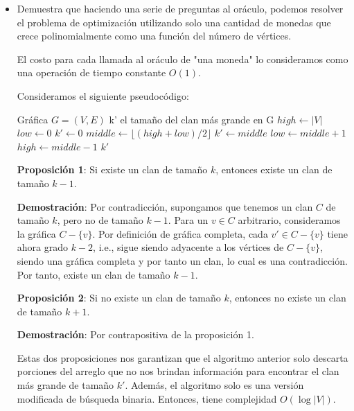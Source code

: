 \begin{itemize}
    \item Demuestra que haciendo una serie de preguntas al oráculo, podemos resolver el problema de optimización utilizando solo una cantidad de monedas que crece polinomialmente como una función del número de vértices.

    El costo para cada llamada al oráculo de "una moneda" lo consideramos como una operación de tiempo constante $O(1)$.

    Consideramos el siguiente pseudocódigo:
    \begin{algorithmic}[1]
    \Require Gráfica $G = (V, E)$
    \Ensure k' el tamaño del clan más grande en G
        \State $high \gets |V|$
        \State $low \gets 0$
        \State $k' \gets 0$
            \State $middle \gets \lfloor (high + low) / 2 \rfloor$
                \State $k' \gets middle$
                \State $low \gets middle + 1$
            \Else{}
                \State $high \gets middle - 1$
            \EndIf
        \EndWhile{}
        \State \Return $k'$
    \EndFunction
    \end{algorithmic}

    \textbf{Proposición 1}: Si existe un clan de tamaño $k$, entonces existe un clan de tamaño $k - 1$.

    \textbf{Demostración}: Por contradicción, supongamos que tenemos un clan $C$ de tamaño $k$, pero no de tamaño $k - 1$. Para un $v \in C$ arbitrario, consideramos la gráfica $C -\{v\}$. Por definición de gráfica completa, cada $v' \in C - \{v\}$ tiene ahora grado $k - 2$, i.e., sigue siendo adyacente a los vértices de $C - \{v\}$, siendo una gráfica completa y por tanto un clan, lo cual es una contradicción. Por tanto, existe un clan de tamaño $k - 1$.

    \textbf{Proposición 2}: Si no existe un clan de tamaño $k$, entonces no existe un clan de tamaño $k + 1$.
    
    \textbf{Demostración}: Por contrapositiva de la proposición 1.

    Estas dos proposiciones nos garantizan que el algoritmo anterior solo descarta porciones del arreglo que no nos brindan información para encontrar el clan más grande de tamaño $k'$. Además, el algoritmo solo es una versión modificada de búsqueda binaria. Entonces, tiene complejidad $O(\log |V|)$.


\end{itemize}
